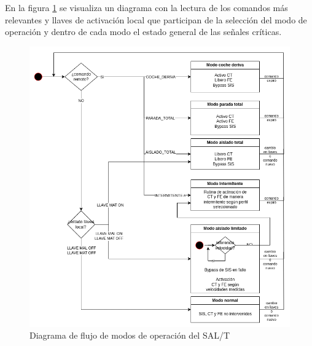 En la figura \ref{fig:modos_salt} se visualiza un diagrama con la lectura de los comandos más relevantes y llaves de activación local que participan de la selección del modo de operación y dentro de cada modo el estado general de las señales críticas. 


\begin{figure}[H]
    \centering
    \includegraphics[width = \linewidth]{img/modos_salt.png}    
    \caption{Diagrama de flujo de modos de operación del SAL/T}
    \label{fig:modos_salt}
\end{figure}    
